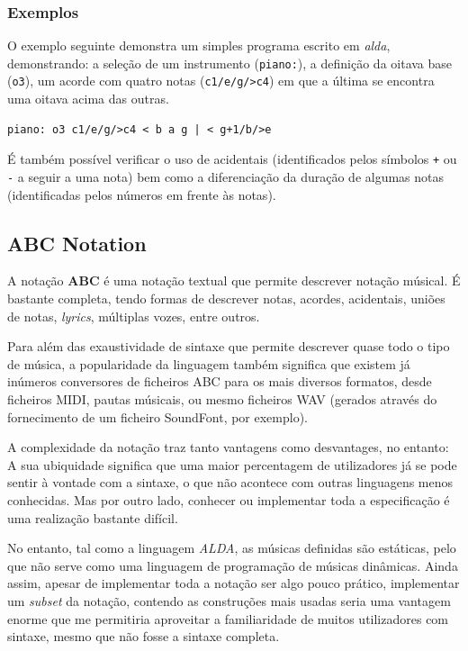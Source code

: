 \documentclass[
  oneside,
  11pt, a4paper,
  footinclude=true,
  headinclude=true,
  cleardoublepage=empty
]{scrbook}
\begin{document}
	\subsubsection{Exemplos}
	O exemplo seguinte demonstra um simples programa escrito em \textit{alda}, demonstrando: a seleção de um instrumento (\texttt{piano:}), a definição da oitava base (\texttt{o3}), um acorde com quatro notas (\texttt{c1/e/g/>c4}) em que a última se encontra uma oitava acima das outras.
\begin{lstlisting}[backgroundcolor=\color{transparent},caption={Exemplo da linguagem alda},captionpos=b,xleftmargin=.28\textwidth]
piano: o3 c1/e/g/>c4 < b a g | < g+1/b/>e
\end{lstlisting}
 É também possível verificar o uso de acidentais (identificados pelos símbolos \texttt{+} ou \texttt{-} a seguir a uma nota) bem como a diferenciação da duração de algumas notas (identificadas pelos números em frente às notas).
	\subsection{ABC Notation}
	A notação \textbf{ABC}\cite{abc-notation} é uma notação textual que permite descrever notação músical. É bastante completa, tendo formas de descrever notas, acordes, acidentais, uniões de notas, \textit{lyrics}, múltiplas vozes, entre outros.
	
	Para além das exaustividade de sintaxe que permite descrever quase todo o tipo de música, a popularidade da linguagem também significa que existem já inúmeros conversores de ficheiros ABC para os mais diversos formatos, desde ficheiros MIDI, pautas músicais, ou mesmo ficheiros WAV (gerados através do fornecimento de um ficheiro SoundFont, por exemplo).
	
	A complexidade da notação traz tanto vantagens como desvantages, no entanto: A sua ubiquidade significa que uma maior percentagem de utilizadores já se pode sentir à vontade com a sintaxe, o que não acontece com outras linguagens menos conhecidas. Mas por outro lado, conhecer ou implementar toda a especificação \cite{abc-notation-standard} é uma realização bastante difícil.
	
	No entanto, tal como a linguagem \textit{ALDA}, as músicas definidas são estáticas, pelo que não serve como uma linguagem de programação de músicas dinâmicas. Ainda assim, apesar de implementar toda a notação ser algo pouco prático, implementar um \textit{subset} da notação, contendo as construções mais usadas seria uma vantagem enorme que me permitiria aproveitar a familiaridade de muitos utilizadores com sintaxe, mesmo que não fosse a sintaxe completa.
	
\end{document}
